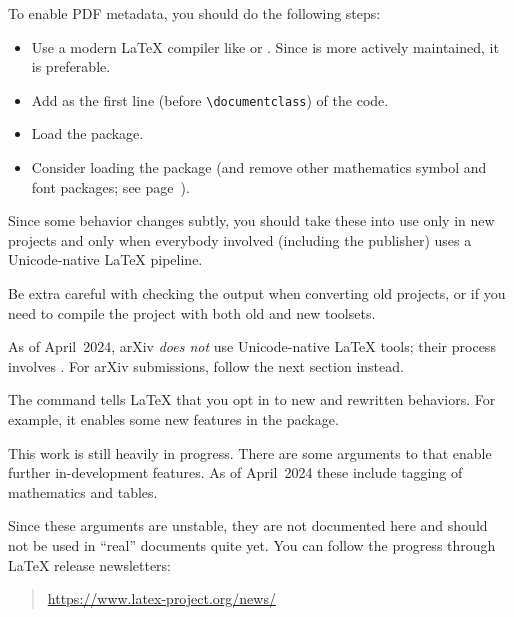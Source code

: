 To enable PDF metadata, you should do the following steps:
\begin{itemize}
\item Use a modern \LaTeX{} compiler like  or .
    Since  is more actively maintained, it is preferable.
\item Add  as the first line (before \verb|\documentclass|) of the code.
\item Load the  package.
\item Consider loading the  package
    (and remove other mathematics symbol and font packages;
    see page~\pageref{rem:math unicode}).
\end{itemize}

\begin{warning}
Since some behavior changes subtly,
you should take these into use only in new projects
and only when everybody involved (including the publisher) uses a Unicode-native \LaTeX{} pipeline.

Be extra careful with checking the output when converting old projects,
or if you need to compile the project with both old and new toolsets.
\end{warning}

\begin{warning}
As of April~2024, arXiv \emph{does not} use Unicode-native \LaTeX{} tools;
their process involves .
For arXiv submissions, follow the next section instead.
\end{warning}

The  command tells \LaTeX{} that you opt in
to new and rewritten behaviors.
For example, it enables some new features in the  package.

\begin{latexthree}
This work is still heavily in progress.
There are some arguments to  that enable further in-development features.
As of April~2024 these include tagging of mathematics and tables.

Since these arguments are unstable, they are not documented here
and should not be used in ``real'' documents quite yet.
You can follow the progress through \LaTeX{} release newsletters:
\begin{quote}
\url{https://www.latex-project.org/news/}
\end{quote}
\end{latexthree}

